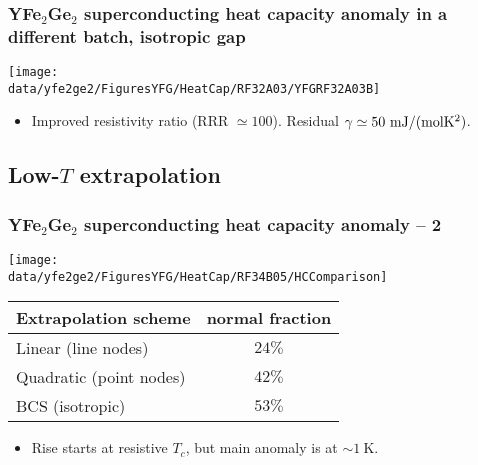 \begin{frame}[label=YFGHeatCap1]
\frametitle{YFe$_2$Ge$_2$ superconducting heat capacity anomaly in a
  different batch, isotropic gap}
\centerline{\texttt{[image: \\data/yfe2ge2/FiguresYFG/HeatCap/RF32A03/YFGRF32A03B]}}

\begin{itemize}
\item 
Improved resistivity ratio (RRR $\simeq 100$).
Residual $\gamma \simeq 50~{\rm mJ/(mol K^2)}$.


\end{itemize}

\end{frame}



\subsection{Low-$T$ extrapolation}
\begin{frame}[label=YFGHeatCap3]
\frametitle{YFe$_2$Ge$_2$ superconducting heat capacity anomaly -- 2}
\centerline{\texttt{[image: \\data/yfe2ge2/FiguresYFG/HeatCap/RF34B05/HCComparison]}}

\begin{center}
\begin{tabular}{l|c}
Extrapolation scheme & normal fraction \\
\hline
Linear (line nodes) & $24 \%$ \\
Quadratic (point nodes) & $42 \%$  \\
BCS (isotropic) & $53 \%$ \\
\hline
\end{tabular}
\end{center}

\begin{itemize}
\item Rise starts at resistive $T_c$, but main anomaly is at $\sim
  1~\mathrm{K}$.
\end{itemize}
\end{frame}


